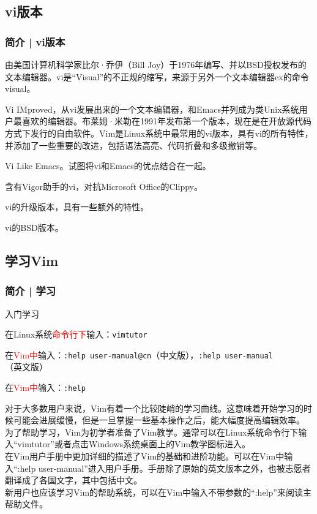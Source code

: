 \subsection{vi版本}
\begin{frame}
  \frametitle{简介 | vi版本}
  \begin{description}[<+->]
    \item[vi] 由美国计算机科学家比尔·乔伊（Bill Joy）于1976年编写、并以BSD授权发布的文本编辑器。vi是“Visual”的不正规的缩写，来源于另外一个文本编辑器ex的命令visual。
    \item[Vim] Vi IMproved，从vi发展出来的一个文本编辑器，和Emacs并列成为类Unix系统用户最喜欢的编辑器。布莱姆·米勒在1991年发布第一个版本，现在是在开放源代码方式下发行的自由软件。Vim是Linux系统中最常用的vi版本，具有vi的所有特性，并添加了一些重要的改进，包括语法高亮、代码折叠和多级撤销等。 
    \item[Vile] Vi Like Emacs。试图将vi和Emacs的优点结合在一起。 
    \item[Vigor] 含有Vigor助手的vi，对抗Microsoft Office的Clippy。
    \item[Elvis] vi的升级版本，具有一些额外的特性。 
    \item[Nvi] vi的BSD版本。 
  \end{description}
\end{frame}

\subsection{学习Vim}
\begin{frame}[fragile]
  \frametitle{简介 | 学习}
  \begin{block}{\alert{入门学习}}
    \begin{description}[<+->]
      \item[Vim初学者教学] 在Linux系统\textcolor{red}{命令行下}输入：\verb|vimtutor|
      \item[Vim用户手册] 在\textcolor{red}{Vim中}输入：\verb|:help user-manual@cn|（中文版），\verb|:help user-manual|（英文版）
      \item[Vim帮助系统] 在\textcolor{red}{Vim中}输入：\verb|:help|
    \end{description}
  \end{block}
  {\footnotesize
  对于大多数用户来说，Vim有着一个比较陡峭的学习曲线。这意味着开始学习的时候可能会进展缓慢，但是一旦掌握一些基本操作之后，能大幅度提高编辑效率。\\
  为了帮助学习，Vim为初学者准备了Vim教学。通常可以在Linux系统命令行下输入“vimtutor”或者点击Windows系统桌面上的Vim教学图标进入。\\
  在Vim用户手册中更加详细的描述了Vim的基础和进阶功能。可以在Vim中输入“:help user-manual”进入用户手册。手册除了原始的英文版本之外，也被志愿者翻译成了各国文字，其中包括中文。\\
  新用户也应该学习Vim的帮助系统，可以在Vim中输入不带参数的“:help”来阅读主帮助文件。}
\end{frame}

